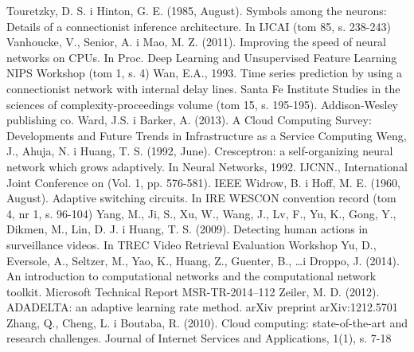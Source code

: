 \documentclass[12pt,a4paper,twoside]{article}
\begin{document}
\begin{thebibliography}{99}
 Touretzky, D. S. i Hinton, G. E. (1985, August). Symbols among the neurons: Details of a connectionist inference architecture. In IJCAI (tom 85, s. 238-243)
 Vanhoucke, V., Senior, A. i Mao, M. Z. (2011). Improving the speed of neural networks on CPUs. In Proc. Deep Learning and Unsupervised Feature Learning NIPS Workshop (tom 1, s. 4)
 Wan, E.A., 1993. Time series prediction by using a connectionist network with internal delay lines. Santa Fe Institute Studies in the sciences of complexity-proceedings volume (tom 15, s. 195-195). Addison-Wesley publishing co.
 Ward, J.S. i Barker, A. (2013). A Cloud Computing Survey: Developments and Future Trends in Infrastructure as a Service Computing
 Weng, J., Ahuja, N. i Huang, T. S. (1992, June). Cresceptron: a self-organizing neural network which grows adaptively. In Neural Networks, 1992. IJCNN., International Joint Conference on (Vol. 1, pp. 576-581). IEEE
 Widrow, B. i Hoff, M. E. (1960, August). Adaptive switching circuits. In IRE WESCON convention record (tom 4, nr 1, s. 96-104)
 Yang, M., Ji, S., Xu, W., Wang, J., Lv, F., Yu, K., Gong, Y., Dikmen, M., Lin, D. J. i Huang, T. S. (2009). Detecting human actions in surveillance videos. In TREC Video Retrieval Evaluation Workshop
 Yu, D., Eversole, A., Seltzer, M., Yao, K., Huang, Z., Guenter, B., \ldots i Droppo, J. (2014). An introduction to computational networks and the computational network toolkit. Microsoft Technical Report MSR-TR-2014–112
 Zeiler, M. D. (2012). ADADELTA: an adaptive learning rate method. arXiv preprint arXiv:1212.5701
 Zhang, Q., Cheng, L. i Boutaba, R. (2010). Cloud computing: state-of-the-art and research challenges. Journal of Internet Services and Applications, 1(1), s. 7-18

\end{thebibliography}
\clearpage

\listoffigures

\clearpage

\listoftables

\clearpage
\end{document}
